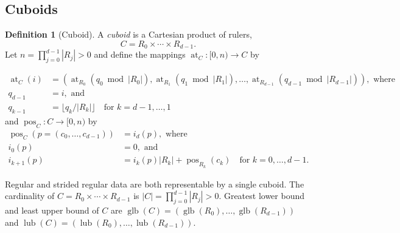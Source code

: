 \documentclass[manuscript,screen,review]{acmart}
\theoremstyle{definition}
\newtheorem{definition}{Definition}
\theoremstyle{plain}
\begin{document}
\subsection{Cuboids}

\begin{definition}[Cuboid]
A \emph{cuboid} is a Cartesian product of rulers,
\[
  C = R_0 \times \cdots \times R_{d-1}.
  \]
  Let $n=\prod_{j=0}^{d-1} |R_j| > 0$ and define the
  mappings $\operatorname{at}_C:[0,n)\to C$ by

\begin{align*}
  \operatorname{at}_C(i) &= (\operatorname{at}_{R_0}(q_0 \bmod
  |R_0|),\operatorname{at}_{R_1}(q_1 \bmod
  |R_1|),\dots,\operatorname{at}_{R_{d-1}}(q_{d-1} \bmod |R_{d-1}|)),
  \text{ where}
  \\ q_{d-1}&=i, \text{ and}
  \\ q_{k-1}&=\lfloor q_k / |R_k| \rfloor \quad\text{for } k=d{-}1,\ldots,1
\end{align*}
  and $\operatorname{pos}_C:C\to [0,n)$ by
\begin{align*}
  \operatorname{pos}_C(p=(c_0,\ldots,c_{d-1})) &= i_d(p), \text{ where}
\\  i_0(p) &= 0, \text{ and}
\\  i_{k+1}(p) &= i_k(p) |R_k| + \operatorname{pos}_{R_k}(c_k) \quad\text{for } k=0,\ldots,d{-}1.
\end{align*}

\end{definition}

Regular and strided regular data are both representable by a single cuboid.
The cardinality of $C = R_0 \times \cdots \times R_{d-1}$
is $|C| = \prod_{j=0}^{d-1} |R_j| > 0$.
Greatest lower bound and least upper bound of $C$ are
$\operatorname{glb}(C) =
(\operatorname{glb}(R_0),\ldots,\operatorname{glb}(R_{d-1}))$ and
$\operatorname{lub}(C) =
(\operatorname{lub}(R_0),\ldots,\operatorname{lub}(R_{d-1}))$.
\end{document}

